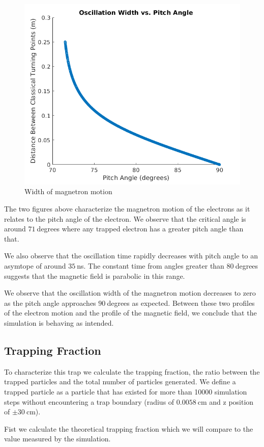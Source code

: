 \documentclass[12pt,letterpaper]{article}
\begin{document}
    \begin{figure}[H]
    \centering
    \includegraphics[width=0.7\linewidth]{img/oscillationwidth.png}
    \caption{Width of magnetron motion}
    \end{figure}

The two figures above characterize the magnetron motion of the electrons as it relates to the pitch angle of the electron. We observe that the critical angle is around $71~$degrees where any trapped electron has a greater pitch angle than that. 

We also observe that the oscillation time rapidly decreases with pitch angle to an asymtope of around $35~$ns. The constant time from angles greater than $80~$degrees suggests that the magnetic field is parabolic in this range.

We observe that the oscillation width of the magnetron motion decreases to zero as the pitch angle approaches $90~$degrees as expected. Between these two profiles of the electron motion and the profile of the magnetic field, we conclude that the simulation is behaving as intended. 

\subsection{Trapping Fraction}

To characterize this trap we calculate the trapping fraction, the ratio between the trapped particles and the total number of particles generated. We define a trapped particle as a particle that has existed for more than 10000 simulation steps without encountering a trap boundary (radius of $0.0058~$cm and z position of $\pm30~$cm).

Fist we calculate the theoretical trapping fraction which we will compare to the value measured by the simulation.
\end{document}
